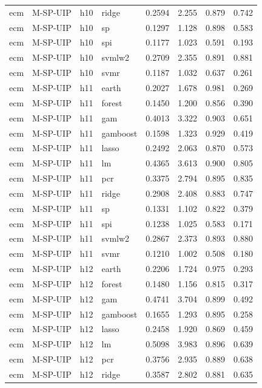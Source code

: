 \begin{ThreePartTable}
\begin{longtable}[t]{llclcccc}
ecm & M-SP-UIP & h10 & ridge & 0.2594 & 2.255 & 0.879 & 0.742\\
ecm & M-SP-UIP & h10 & sp & 0.1297 & 1.128 & 0.898 & 0.583\\
ecm & M-SP-UIP & h10 & spi & 0.1177 & 1.023 & 0.591 & 0.193\\
ecm & M-SP-UIP & h10 & svmlw2 & 0.2709 & 2.355 & 0.891 & 0.881\\
ecm & M-SP-UIP & h10 & svmr & 0.1187 & 1.032 & 0.637 & 0.261\\
\addlinespace
ecm & M-SP-UIP & h11 & earth & 0.2027 & 1.678 & 0.981 & 0.269\\
ecm & M-SP-UIP & h11 & forest & 0.1450 & 1.200 & 0.856 & 0.390\\
ecm & M-SP-UIP & h11 & gam & 0.4013 & 3.322 & 0.903 & 0.651\\
ecm & M-SP-UIP & h11 & gamboost & 0.1598 & 1.323 & 0.929 & 0.419\\
ecm & M-SP-UIP & h11 & lasso & 0.2492 & 2.063 & 0.870 & 0.573\\
ecm & M-SP-UIP & h11 & lm & 0.4365 & 3.613 & 0.900 & 0.805\\
ecm & M-SP-UIP & h11 & pcr & 0.3375 & 2.794 & 0.895 & 0.835\\
ecm & M-SP-UIP & h11 & ridge & 0.2908 & 2.408 & 0.883 & 0.747\\
ecm & M-SP-UIP & h11 & sp & 0.1331 & 1.102 & 0.822 & 0.379\\
ecm & M-SP-UIP & h11 & spi & 0.1238 & 1.025 & 0.583 & 0.171\\
ecm & M-SP-UIP & h11 & svmlw2 & 0.2867 & 2.373 & 0.893 & 0.880\\
ecm & M-SP-UIP & h11 & svmr & 0.1210 & 1.002 & 0.508 & 0.180\\
\addlinespace
ecm & M-SP-UIP & h12 & earth & 0.2206 & 1.724 & 0.975 & 0.293\\
ecm & M-SP-UIP & h12 & forest & 0.1480 & 1.156 & 0.815 & 0.317\\
ecm & M-SP-UIP & h12 & gam & 0.4741 & 3.704 & 0.899 & 0.492\\
ecm & M-SP-UIP & h12 & gamboost & 0.1655 & 1.293 & 0.895 & 0.258\\
ecm & M-SP-UIP & h12 & lasso & 0.2458 & 1.920 & 0.869 & 0.459\\
ecm & M-SP-UIP & h12 & lm & 0.5098 & 3.983 & 0.896 & 0.639\\
ecm & M-SP-UIP & h12 & pcr & 0.3756 & 2.935 & 0.889 & 0.638\\
ecm & M-SP-UIP & h12 & ridge & 0.3587 & 2.802 & 0.881 & 0.635\\

\end{longtable}
\end{ThreePartTable}
